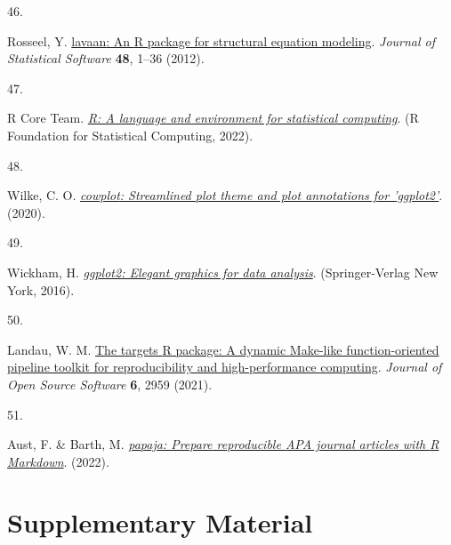 \documentclass[
  man, donotrepeattitle,floatsintext]{apa6}
\newlength{\cslhangindent}
\newlength{\csllabelwidth}
\newlength{\cslentryspacingunit} %
\newenvironment{CSLReferences}[2] %
 {%
  \setlength{\parindent}{0pt}
  \ifodd #1
  \let\oldpar\par
  \def\par{\hangindent=\cslhangindent\oldpar}
  \fi
  \setlength{\parskip}{#2\cslentryspacingunit}
 }%
 {}
\newcommand{\CSLLeftMargin}[1]{\parbox[t]{\csllabelwidth}{#1}}
\newcommand{\CSLRightInline}[1]{\parbox[t]{\linewidth - \csllabelwidth}{#1}\break}
\begin{document}
\begin{CSLReferences}{0}{0}
\leavevmode{}%
\CSLLeftMargin{46. }%
\CSLRightInline{Rosseel, Y. \href{https://doi.org/10.18637/jss.v048.i02}{{lavaan}: An {R} package for structural equation modeling}. \emph{Journal of Statistical Software} \textbf{48}, 1--36 (2012).}

\leavevmode{}%
\CSLLeftMargin{47. }%
\CSLRightInline{R Core Team. \emph{\href{https://www.R-project.org/}{R: A language and environment for statistical computing}}. (R Foundation for Statistical Computing, 2022).}

\leavevmode{}%
\CSLLeftMargin{48. }%
\CSLRightInline{Wilke, C. O. \emph{\href{https://CRAN.R-project.org/package=cowplot}{{cowplot}: Streamlined plot theme and plot annotations for 'ggplot2'}}. (2020).}

\leavevmode{}%
\CSLLeftMargin{49. }%
\CSLRightInline{Wickham, H. \emph{\href{https://ggplot2.tidyverse.org}{{ggplot2}: Elegant graphics for data analysis}}. (Springer-Verlag New York, 2016).}

\leavevmode{}%
\CSLLeftMargin{50. }%
\CSLRightInline{Landau, W. M. \href{https://doi.org/10.21105/joss.02959}{The targets {R} package: A dynamic {M}ake-like function-oriented pipeline toolkit for reproducibility and high-performance computing}. \emph{Journal of Open Source Software} \textbf{6}, 2959 (2021).}

\leavevmode{}%
\CSLLeftMargin{51. }%
\CSLRightInline{Aust, F. \& Barth, M. \emph{\href{https://github.com/crsh/papaja}{{papaja}: {Prepare} reproducible {APA} journal articles with {R Markdown}}}. (2022).}

\end{CSLReferences}

\endgroup

\newpage
\vspace*{60mm}

\renewcommand{\thefigure}{S\arabic{figure}} \setcounter{figure}{0}
\renewcommand{\thetable}{S\arabic{table}} \setcounter{table}{0}
\renewcommand{\theequation}{S\arabic{equation}} \setcounter{equation}{0}

\hypertarget{supplementary-material}{%
\section{\texorpdfstring{\textbf{Supplementary Material}}{Supplementary Material}}\label{supplementary-material}}
\end{document}
